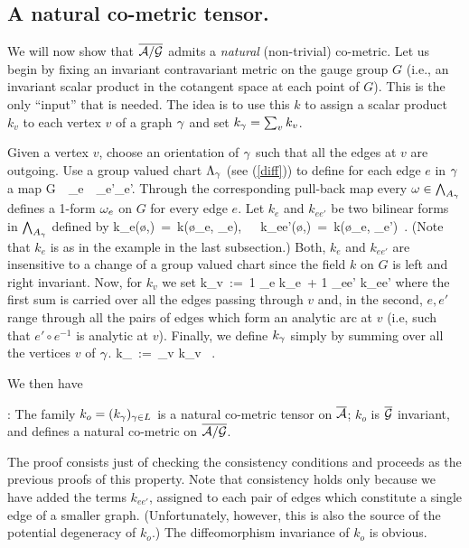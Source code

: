 \goodbreak
\subsection{A natural co-metric tensor.} 

We will now show that $\overline{{\cal A}/{\cal G}}$ admits a {\it natural} (non-trivial)
co-metric. Let us begin by fixing an invariant contravariant metric on
the gauge group $G$ (i.e., an invariant scalar product in the
cotangent space at each point of $G$). This is the only ``input'' that
is needed. The idea is to use this $k$ to assign a scalar product
$k_v$ to each vertex $v$ of a graph $\gamma$ and set $k_\gamma= \sum_v k_v$.

Given a vertex $v$, choose an orientation of $\gamma$ such that all the
edges at $v$ are outgoing.  Use a group valued chart $\Lambda_\gamma$ (see
(\ref{diff})) to define for each edge $e$ in $\gamma$ a map
\be
G\ \rightarrow\ \A_e\ \rightarrow\ \times_{e'\in\g}\A_{e'}.
\ee
Through the corresponding pull-back map every $\omega\in\bigwedge_{A_\gamma}$
defines a 1-form $\omega_e$ on $G$ for every edge $e$. Let $k_e$ and
$k_{ee'}$ be two bilinear forms in $\bigwedge_{A_\gamma}$ defined by
\be
k_e(\o,\nu)\ =\ k(\o_e, \nu_{e}),\ \ \ k_{ee'}(\o,\nu)\ 
=\ k(\o_e, \nu_{e'})\ .
\ee
(Note that $k_e$ is as in the example in the last subsection.)  Both,
$k_e$ and $k_{ee'}$ are insensitive to a change of a group valued
chart since the field $k$ on $G$ is left and right invariant.  Now,
for $k_v$ we set
\be \label{sum}
k_v\ :=\ {1} \sum_e k_e\ + {1} \sum_{ee'} k_{ee'}
\ee
where the first sum is carried over all the edges passing through $v$
and, in the second, $e,e'$ range through all the pairs of edges 
which form an analytic arc at $v$ (i.e, such that $e'\circ e^{-1}$ is
analytic at $v$). Finally, we define $k_\gamma$ simply by summing over 
all the vertices $v$ of $\gamma$.
\be \label{k}
k_\g\ :=\ \sum_v k_v \ .
\ee

We then have
\begin{proposition}{\rm :} \label{naturalk} The family $k_o = 
(k_\gamma)_{\gamma\in L}$ is a natural co-metric tensor on $\overline{{\cal A}}$; $k_o$
is ${\overline {{\cal G}}}$ invariant, and defines a natural co-metric on $\overline{{\cal A}/{\cal G}}$.
\end{proposition}

The proof consists just of checking the consistency conditions and
proceeds as the previous proofs of this property. Note that
consistency holds only because we have added the terms $k_{ee'}$,
assigned to each pair of edges which constitute a single edge of a
smaller graph. (Unfortunately, however, this is also the source of the
potential degeneracy of $k_o$.) The diffeomorphism invariance of $k_o$
is obvious.


